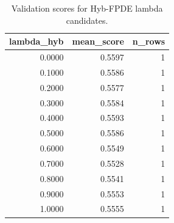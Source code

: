 \begin{table}[t]
\caption{Validation scores for Hyb-FPDE lambda candidates.}
\label{tab:lambda_distribution_computed}
\centering
\begin{tabular}{rrr}
\toprule
lambda\_hyb & mean\_score & n\_rows \\
\midrule
0.0000 & 0.5597 & 1 \\
0.1000 & 0.5586 & 1 \\
0.2000 & 0.5577 & 1 \\
0.3000 & 0.5584 & 1 \\
0.4000 & 0.5593 & 1 \\
0.5000 & 0.5586 & 1 \\
0.6000 & 0.5549 & 1 \\
0.7000 & 0.5528 & 1 \\
0.8000 & 0.5541 & 1 \\
0.9000 & 0.5553 & 1 \\
1.0000 & 0.5555 & 1 \\
\bottomrule
\end{tabular}

\end{table}
